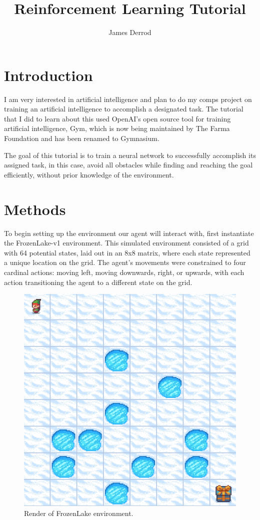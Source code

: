 \documentclass[10pt,twocolumn]{article}
\title{Reinforcement Learning Tutorial}
\author{James Derrod}
\affiliation{Occidental College}
\begin{document}
\maketitle

\section{Introduction}
    I am very interested in artificial intelligence and plan to do my comps project on training an artificial intelligence to accomplish a designated task. The tutorial that I did to learn about this used OpenAI's open source tool for training artificial intelligence, Gym, which is now being maintained by The Farma Foundation and has been renamed to Gymnasium.\cite{FrozenLake}\cite{FrozenLakeTutorial} \cite{InstallTutorial}

    The goal of this tutorial is to train a neural network to successfully accomplish its assigned task, in this case, avoid all obstacles while finding and reaching the goal efficiently, without prior knowledge of the environment.

\section{Methods}

    
    To begin setting up the environment our agent will interact with, first instantiate the FrozenLake-v1 environment. This simulated environment consisted of a grid with 64 potential states, laid out in an 8x8 matrix, where each state represented a unique location on the grid. The agent's movements were constrained to four cardinal actions: moving left, moving downwards, right, or upwards, with each action transitioning the agent to a different state on the grid.

    \begin{figure}[ht]
    \centering
    \includegraphics[width=0.70\linewidth]{FrozenLake8x8.PNG}
    \caption{Render of FrozenLake environment.}
    \label{fig:frozenlakeenv}
    \end{figure}
    
\end{document}
